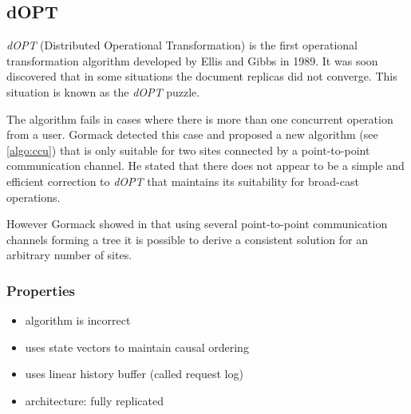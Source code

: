 \subsection{dOPT}
\label{algo:dopt}

\emph{dOPT} (Distributed Operational Transformation) is the first operational transformation algorithm developed by {Ellis and Gibbs}\cite{ellis} in 1989. It was soon discovered that in some situations the document replicas did not converge. This situation is known as the \emph{dOPT} puzzle.

The algorithm fails in cases where there is more than one concurrent operation from a user. Gormack\cite{cormack95a} detected this case and proposed a new algorithm (see \ref{algo:ccu}) that is only suitable for two sites connected by a point-to-point communication channel. He stated that there does not appear to be a simple and efficient correction to \emph{dOPT} that maintains its suitability for broad-cast operations.

However Gormack showed in \cite{cormack95b} that using several point-to-point communication channels forming a tree it is possible to derive a consistent solution for an arbitrary number of sites.

\subsubsection{Properties}
\begin{itemize}
 \item algorithm is incorrect
 \item uses state vectors to maintain causal ordering
 \item uses linear history buffer (called request log)
 \item architecture: fully replicated
\end{itemize}
